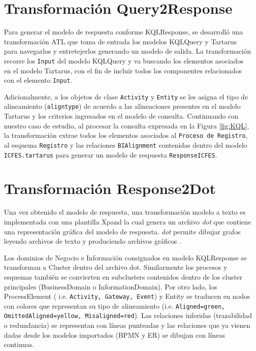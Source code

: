 \section{Transformaci\'on Query2Response}

Para generar el modelo de respuesta conforme KQLResponse, se desarroll\'o una transformaci\'on ATL \cite{Jouault:2008} que toma de entrada los modelos KQLQuery y Tartarus para navegarlos y entretejerlos generando un modelo de salida. La transformaci\'on recorre los \texttt{Input} del modelo KQLQuery y va buscando los elementos asociados en el modelo Tartarus, con el fin de incluir todos los componentes relacionados con el elemento \texttt{Input}. 

Adicionalmente, a los objetos de clase \texttt{Activity} y \texttt{Entity} se les asigna el tipo de alineamiento (\texttt{aligntype}) de acuerdo a las alineaciones presentes en el modelo Tartarus y los criterios ingresados en el modelo de consulta. Continuando con nuestro caso de estudio, al procesar la consulta expresada en la Figura \ref{fig:KQL}, la transformaci\'on extrae todos los elementos asociados al \texttt{Proceso de Registro}, al esquema \texttt{Registro} y las relaciones \texttt{BIAlignment} contenidas dentro del modelo \texttt{ICFES.tartarus} para generar un modelo de respuesta \texttt{ResponseICFES}.

\section{Transformaci\'on Response2Dot}

Una vez obtenido el modelo de respuesta, una transformaci\'on modelo a texto es implementada con una plantilla Xpand la cual genera un archivo \textit{dot} que contiene una representaci\'on gr\'afica del modelo de respuesta. \textit{dot} permite dibujar grafos leyendo archivos de texto y produciendo archivos gr\'aficos \cite{Koutsofios:2002}. 

Los dominios de Negocio e Informaci\'on consignados en modelo KQLResponse se transforman a Cluster dentro del archivo dot. Similarmente los procesos y esquemas tambi\'en se convierten en subclusters contenidos dentro de los cluster principales (BusinessDomain o InformationDomain). Por otro lado, los ProcessElement ( i.e. \texttt{Activity, Gateway, Event}) y Entity se traducen en nodos con colores que representan su tipo de alineamiento (i.e. \texttt{Aligned=green, OmittedAligned=yellow, Misaligned=red}). Las relaciones inferidas (trazabilidad o redundancia) se representan con l\'ineas punteadas y las relaciones que ya vienen dadas desde los modelos importados (BPMN y ER) se dibujan con l\'ineas continuas. 

